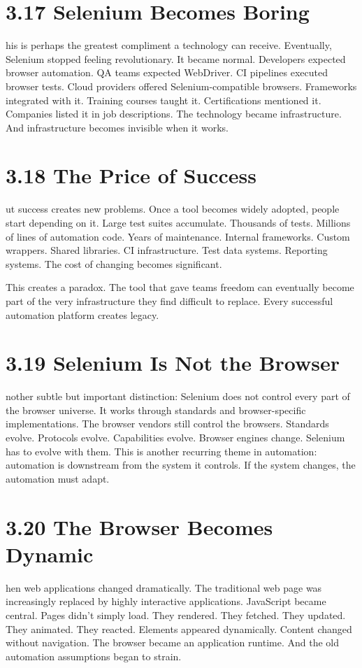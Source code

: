 \documentclass[11pt, a4paper, openany]{book}
\newcommand{\initialcap}[1]{{\fontfamily{lmss}\selectfont\huge\textbf{#1}}}
\begin{document}
\section{3.17 Selenium Becomes Boring}
\noindent \initialcap{T}his is perhaps the greatest compliment a technology can receive. Eventually, Selenium stopped feeling revolutionary. It became normal. Developers expected browser automation. QA teams expected WebDriver. CI pipelines executed browser tests. Cloud providers offered Selenium-compatible browsers. Frameworks integrated with it. Training courses taught it. Certifications mentioned it. Companies listed it in job descriptions. The technology became infrastructure. And infrastructure becomes invisible when it works.

\section{3.18 The Price of Success}
\noindent \initialcap{B}ut success creates new problems. Once a tool becomes widely adopted, people start depending on it. Large test suites accumulate. Thousands of tests. Millions of lines of automation code. Years of maintenance. Internal frameworks. Custom wrappers. Shared libraries. CI infrastructure. Test data systems. Reporting systems. The cost of changing becomes significant.

This creates a paradox. The tool that gave teams freedom can eventually become part of the very infrastructure they find difficult to replace. Every successful automation platform creates legacy.

\section{3.19 Selenium Is Not the Browser}
\noindent \initialcap{A}nother subtle but important distinction: Selenium does not control every part of the browser universe. It works through standards and browser-specific implementations. The browser vendors still control the browsers. Standards evolve. Protocols evolve. Capabilities evolve. Browser engines change. Selenium has to evolve with them. This is another recurring theme in automation: automation is downstream from the system it controls. If the system changes, the automation must adapt.

\section{3.20 The Browser Becomes Dynamic}
\noindent \initialcap{T}hen web applications changed dramatically. The traditional web page was increasingly replaced by highly interactive applications. JavaScript became central. Pages didn't simply load. They rendered. They fetched. They updated. They animated. They reacted. Elements appeared dynamically. Content changed without navigation. The browser became an application runtime. And the old automation assumptions began to strain.
\end{document}
